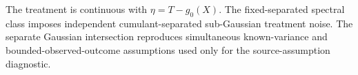 The treatment is continuous with \(\eta=T-g_0(X)\).  The fixed-separated spectral class imposes independent cumulant-separated sub-Gaussian treatment noise.  The separate Gaussian intersection reproduces simultaneous known-variance and bounded-observed-outcome assumptions used only for the source-assumption diagnostic.